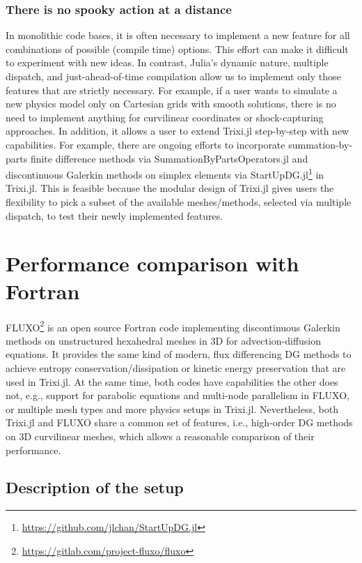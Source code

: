 \documentclass[hidelinks]{juliacon} %
\makeatletter
\newcommand{\eg}[0]{{e.g.\@}\xspace}
\newcommand{\ie}[0]{{i.e.\@}\xspace}
\newcommand{\trixi}{Trixi.jl\xspace}
\makeatother
\begin{document}
\subsubsection{There is no spooky action at a distance}

In monolithic code bases, it is often necessary to implement a new
feature for all combinations of possible (compile time) options. This effort
can make it difficult to experiment with new ideas. In contrast, Julia's dynamic
nature, multiple dispatch, and just-ahead-of-time compilation allow us to implement only those features
that are strictly necessary. For example, if a user wants to simulate a new
physics model only on Cartesian grids with smooth solutions, there is no need
to implement anything for curvilinear coordinates or shock-capturing approaches.
In addition, it allows a user to extend \trixi step-by-step with new capabilities.
For example, there are ongoing efforts to incorporate summation-by-parts finite
difference methods via SummationByPartsOperators.jl \cite{ranocha2021sbp} and
discontinuous Galerkin methods on simplex elements via StartUpDG.jl\footnote{\url{https://github.com/jlchan/StartUpDG.jl}} in \trixi.
This is feasible because the modular design of \trixi gives users the flexibility to pick
a subset of the available meshes/methods, selected via multiple dispatch,
to test their newly implemented features.



\section{Performance comparison with Fortran}
\label{sec:performance-comparison}

FLUXO\footnote{\url{https://gitlab.com/project-fluxo/fluxo}} is an open source
Fortran code implementing discontinuous Galerkin methods on unstructured hexahedral
meshes in 3D for advection-diffusion equations. It provides
the same kind of modern, flux differencing DG methods
to achieve entropy conservation/dissipation or kinetic energy preservation that are used in \trixi.
At the same time, both codes have capabilities the other does not, \eg,
support for parabolic equations and multi-node parallelism in FLUXO,
or multiple mesh types and more physics setups in \trixi. Nevertheless,
both \trixi and FLUXO share a common set of features, \ie, high-order DG
methods on 3D curvilinear meshes, which allows a reasonable comparison of their performance.


\subsection{Description of the setup}
\end{document}
